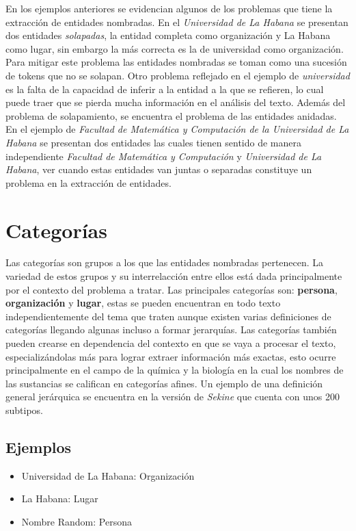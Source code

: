 \documentclass[runningheads]{llncs}
\begin{document}
En los ejemplos anteriores se evidencian algunos de los problemas que tiene la extracción de entidades nombradas. En el \emph{Universidad de La Habana} se presentan dos entidades \emph{solapadas}, la entidad completa como organización y La Habana como lugar, sin embargo la más correcta es la de universidad como organización. Para mitigar este problema las entidades nombradas se toman como una sucesión de tokens que no se solapan. Otro problema reflejado en el ejemplo de \emph{universidad} es la falta de la capacidad de inferir a la entidad a la que se refieren, lo cual puede traer que se pierda mucha información en el análisis del texto. Además del problema de solapamiento, se encuentra el problema de las entidades anidadas. En el ejemplo de \emph{Facultad de Matemática y Computación de la Universidad de La Habana} se presentan dos entidades las cuales tienen sentido de manera independiente \emph{Facultad de Matemática y Computación} y \emph{Universidad de La Habana}, ver cuando estas entidades van juntas o separadas constituye un problema en la extracción de entidades.

\section{Categorías}

Las categorías son grupos a los que las entidades nombradas pertenecen. La variedad de estos grupos y su interrelacción entre ellos está dada principalmente por el contexto del problema a tratar. Las principales categorías son: \textbf{persona}, \textbf{organización} y \textbf{lugar}, estas se pueden encuentran en todo texto independientemente del tema que traten aunque existen varias definiciones de categorías llegando algunas incluso a formar jerarquías. Las categorías también pueden crearse en dependencia del contexto en que se vaya a procesar el texto, especializándolas más para lograr extraer información más exactas, esto ocurre principalmente en el campo de la química y la biología en la cual los nombres de las sustancias se califican en categorías afines. Un ejemplo de una definición general jerárquica se encuentra en la versión de \emph{Sekine}\cite{sekine} que cuenta con unos 200 subtipos.

\subsection{Ejemplos}

\begin{itemize}

\item Universidad de La Habana: Organización
\item La Habana: Lugar
\item Nombre Random: Persona %

\end{itemize}
\end{document}

